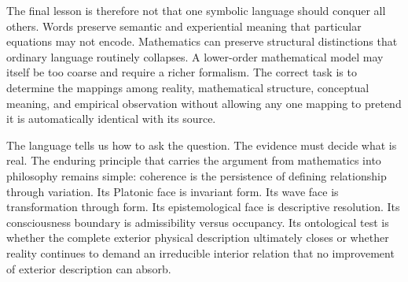 The final lesson is therefore not that one symbolic language should conquer all others. Words preserve semantic and experiential meaning that particular equations may not encode. Mathematics can preserve structural distinctions that ordinary language routinely collapses. A lower-order mathematical model may itself be too coarse and require a richer formalism. The correct task is to determine the mappings among reality, mathematical structure, conceptual meaning, and empirical observation without allowing any one mapping to pretend it is automatically identical with its source.

The language tells us how to ask the question. The evidence must decide what is real. The enduring principle that carries the argument from mathematics into philosophy remains simple: coherence is the persistence of defining relationship through variation. Its Platonic face is invariant form. Its wave face is transformation through form. Its epistemological face is descriptive resolution. Its consciousness boundary is admissibility versus occupancy. Its ontological test is whether the complete exterior physical description ultimately closes or whether reality continues to demand an irreducible interior relation that no improvement of exterior description can absorb.
